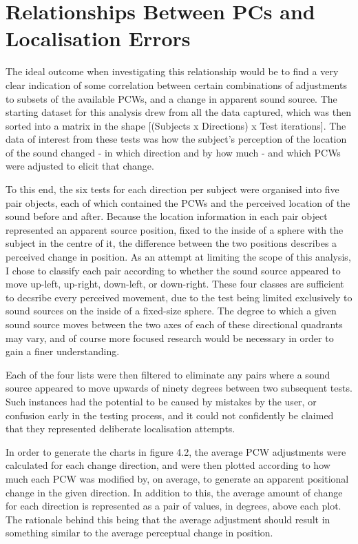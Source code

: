 \section{Relationships Between PCs and Localisation Errors}
The ideal outcome when investigating this relationship would be to find a very clear indication of some correlation between certain combinations of adjustments to subsets of the available PCWs, and a change in apparent sound source. The starting dataset for this analysis drew from all the data captured, which was then sorted into a matrix in the shape [(Subjects x Directions) x Test iterations]. The data of interest from these tests was how the subject's perception of the location of the sound changed - in which direction and by how much - and which PCWs were adjusted to elicit that change. 

To this end, the six tests for each direction per subject were organised into five pair objects, each of which contained the PCWs and the perceived location of the sound before and after. Because the location information in each pair object represented an apparent source position, fixed to the inside of a sphere with the subject in the centre of it, the difference between the two positions describes a perceived change in position. As an attempt at limiting the scope of this analysis, I chose to classify each pair according to whether the sound source appeared to move up-left, up-right, down-left, or down-right. These four classes are sufficient to decsribe every perceived movement, due to the test being limited exclusively to sound sources on the inside of a fixed-size sphere. The degree to which a given sound source moves between the two axes of each of these directional quadrants may vary, and of course more focused research would be necessary in order to gain a finer understanding.

Each of the four lists were then filtered to eliminate any pairs where a sound source appeared to move upwards of ninety degrees between two subsequent tests. Such instances had the potential to be caused by mistakes by the user, or confusion early in the testing process, and it could not confidently be claimed that they represented deliberate localisation attempts. 

In order to generate the charts in figure 4.2, the average PCW adjustments were calculated for each change direction, and were then plotted according to how much each PCW was modified by, on average, to generate an apparent positional change in the given direction. In addition to this, the average amount of change for each direction is represented as a pair of values, in degrees, above each plot. The rationale behind this being that the average adjustment should result in something similar to the average perceptual change in position.

